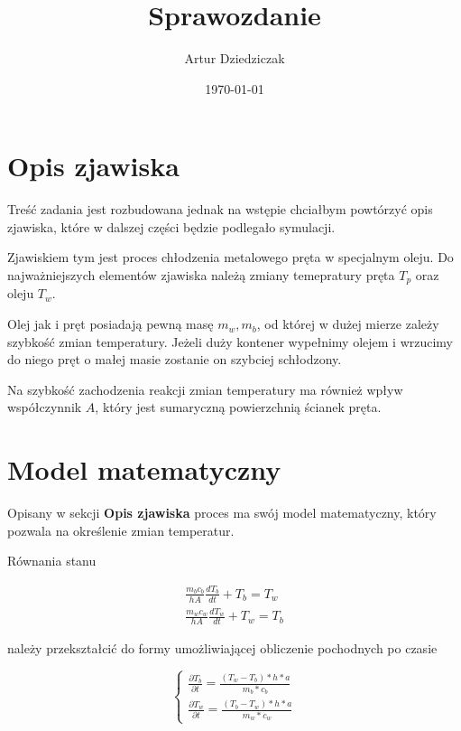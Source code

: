 \documentclass[varwidth,12pt,a4paper]{article}
\title{Sprawozdanie}
\author{Artur Dziedziczak}
\date{\today}
\begin{document}
\maketitle

\section{Opis zjawiska}

Treść zadania jest rozbudowana jednak na wstępie chciałbym powtórzyć opis zjawiska, które w dalszej części będzie podlegało symulacji.

Zjawiskiem tym jest proces chłodzenia metalowego pręta w specjalnym oleju. Do najważniejszych elementów zjawiska należą zmiany temepratury
pręta $T_p$ oraz oleju $T_w$.

Olej jak i pręt posiadają pewną masę $m_w, m_b$, od której w dużej mierze zależy szybkość zmian temperatury. Jeżeli 
duży kontener wypełnimy olejem i wrzucimy do niego pręt o małej masie zostanie on szybciej schłodzony.

Na szybkość zachodzenia reakcji zmian temperatury ma również wpływ współczynnik $A$, który jest sumaryczną powierzchnią
ścianek pręta.

\section{Model matematyczny}

Opisany w sekcji \textbf{Opis zjawiska} proces ma swój model matematyczny, który pozwala na określenie zmian temperatur.
\newline

Równania stanu

\begin{align}
    \frac{m_b c_b}{hA} \frac{dT_b}{dt} + T_b = T_w  \\
    \frac{m_w c_w}{hA} \frac{dT_w}{dt} + T_w = T_b  \nonumber
\end{align}

należy przekształcić do formy umożliwiającej obliczenie pochodnych po czasie

\begin{equation}
     \begin{cases}
    \frac{\partial T_b}{\partial t}=\frac{(T_w-T_b)*h*a}{m_b*c_b} \\
    \frac{\partial T_w}{\partial t}=\frac{(T_b-T_w)*h*a}{m_w*c_w} 
    \end{cases}
\end{equation}
\end{document}
